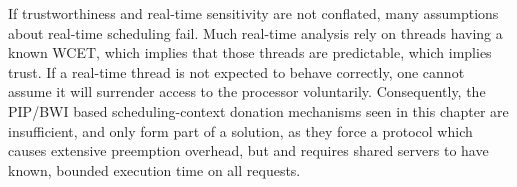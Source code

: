 If trustworthiness and real-time sensitivity are not conflated, many assumptions about real-time
scheduling fail.
Much real-time analysis rely on threads having a known \gls{WCET}, which implies that those threads
are predictable, which implies trust.
If a real-time thread is not expected to behave correctly, one cannot
assume it will surrender access to the processor voluntarily.
Consequently, the \gls{PIP}/\gls{BWI} based scheduling-context donation mechanisms seen in this chapter are
insufficient, and only form part of a solution, as they force a protocol which causes extensive preemption 
overhead, but and requires shared servers to have known, bounded execution time on all requests.
